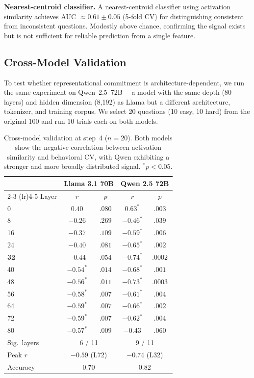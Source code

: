 \documentclass{article}
\begin{document}
\textbf{Nearest-centroid classifier.} A nearest-centroid classifier using activation similarity achieves AUC $\approx 0.61 \pm 0.05$ (5-fold CV) for distinguishing consistent from inconsistent questions. Modestly above chance, confirming the signal exists but is not sufficient for reliable prediction from a single feature.

\subsection{Cross-Model Validation}

To test whether representational commitment is architecture-dependent, we run the same experiment on Qwen~2.5~72B \citep{qwen2.5}---a model with the same depth (80 layers) and hidden dimension (8{,}192) as Llama but a different architecture, tokenizer, and training corpus. We select 20 questions (10 easy, 10 hard) from the original 100 and run 10 trials each on both models.

\begin{table}[t]
\caption{Cross-model validation at step~4 ($n = 20$). Both models show the negative correlation between activation similarity and behavioral CV, with Qwen exhibiting a stronger and more broadly distributed signal. $^*p < 0.05$.}
\label{tab:crossmodel}
\centering
\small
\begin{tabular}{lcccc}
\toprule
 & \multicolumn{2}{c}{Llama 3.1 70B} & \multicolumn{2}{c}{Qwen 2.5 72B} \\
\cmidrule(lr){2-3} \cmidrule(lr){4-5}
Layer & $r$ & $p$ & $r$ & $p$ \\
\midrule
0  & $0.40$ & $.080$ & $0.63^*$ & $.003$ \\
8  & $-0.26$ & $.269$ & $-0.46^*$ & $.039$ \\
16 & $-0.37$ & $.109$ & $-0.59^*$ & $.006$ \\
24 & $-0.40$ & $.081$ & $-0.65^*$ & $.002$ \\
\textbf{32} & $-0.44$ & $.054$ & $\mathbf{-0.74^*}$ & $\mathbf{.0002}$ \\
40 & $-0.54^*$ & $.014$ & $-0.68^*$ & $.001$ \\
48 & $-0.56^*$ & $.011$ & $-0.73^*$ & $.0003$ \\
56 & $-0.58^*$ & $.007$ & $-0.61^*$ & $.004$ \\
64 & $-0.59^*$ & $.007$ & $-0.66^*$ & $.002$ \\
72 & $-0.59^*$ & $.007$ & $-0.62^*$ & $.004$ \\
80 & $-0.57^*$ & $.009$ & $-0.43$ & $.060$ \\
\midrule
Sig.\ layers & \multicolumn{2}{c}{6 / 11} & \multicolumn{2}{c}{9 / 11} \\
Peak $r$ & \multicolumn{2}{c}{$-0.59$ (L72)} & \multicolumn{2}{c}{$-0.74$ (L32)} \\
Accuracy & \multicolumn{2}{c}{0.70} & \multicolumn{2}{c}{0.82} \\
\bottomrule
\end{tabular}
\end{table}
\end{document}

